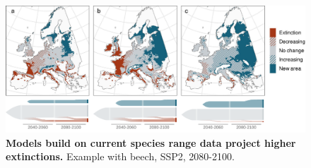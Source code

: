 \documentclass[11pt,letter]{article}
\begin{document}
\begin{figure}
	\centering
	\includegraphics[width=1\linewidth]{../newfigures/files/sankey/fagus_sankey.pdf}
	\caption{\textbf{Models build on current species range data project higher extinctions.} Example with beech, SSP2, 2080-2100.}
	\label{fig:diffproj}
\end{figure}
\end{document}
